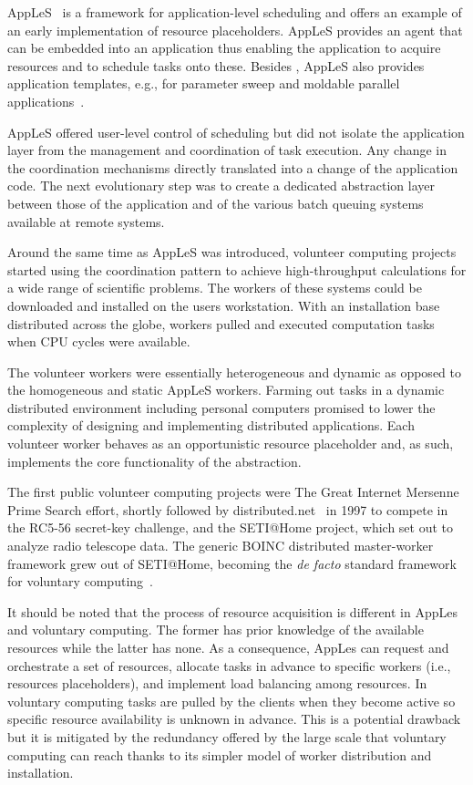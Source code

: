\documentclass{sig-alternate}
\begin{document}
AppLeS~\cite{berman1996application} is a framework for application-level
scheduling and offers an example of an early implementation of resource
placeholders. AppLeS provides an agent that can be embedded into an application
thus enabling the application to acquire resources and to schedule tasks onto
these. Besides \MW, AppLeS also provides application templates, e.g., for
parameter sweep and moldable parallel applications~\cite{berman2003adaptive}.

AppLeS offered user-level control of scheduling but did not isolate the
application layer from the management and coordination of task execution. Any
change in the coordination mechanisms directly translated into a change of the
application code. The next evolutionary step was to create a dedicated
abstraction layer between those of the application and of the various batch
queuing systems available at remote systems.

Around the same time as AppLeS was introduced, volunteer computing projects
started using the \MW coordination pattern to achieve high-throughput
calculations for a wide range of scientific problems. The workers of these
systems could be downloaded and installed on the users workstation.
With an installation base distributed across the globe, workers pulled and
executed computation tasks when CPU cycles were available.

The volunteer workers were essentially heterogeneous and dynamic as opposed to
the homogeneous and static AppLeS workers. Farming out tasks in a dynamic
distributed environment including personal computers promised to lower the
complexity of designing and implementing distributed applications. Each
volunteer worker behaves as an opportunistic resource placeholder and, as such,
implements the core functionality of the \pilot abstraction.

The first public volunteer computing projects were The Great Internet Mersenne
Prime Search effort\cite{woltman2004great}, shortly followed by
distributed.net~\cite{lawton2000distributed} in 1997 to compete in the
RC5-56 secret-key challenge, and the SETI@Home project, which set out to
analyze radio telescope data. The generic BOINC distributed master-worker
framework grew out of SETI@Home, becoming the {\it de facto} standard framework
for voluntary computing~\cite{anderson2004boinc}.

It should be noted that the process of resource acquisition is different in
AppLes and voluntary computing. The former has prior knowledge of the available
resources while the latter has none. As a consequence, AppLes can request and
orchestrate a set of resources, allocate tasks in advance to specific workers
(i.e., resources placeholders), and implement load balancing among resources. In
voluntary computing tasks are pulled by the clients when they become active so
specific resource availability is unknown in advance. This is a potential
drawback but it is mitigated by the redundancy offered by the large scale that
voluntary computing can reach thanks to its simpler model of worker distribution
and installation.
\end{document}
